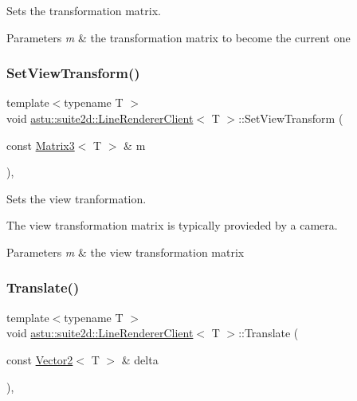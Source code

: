 Sets the transformation matrix.


\begin{DoxyParams}{Parameters}
{\em m} & the transformation matrix to become the current one \\
\hline
\end{DoxyParams}
\mbox{\label{classastu_1_1suite2d_1_1LineRendererClient_a8377c0e0d4427efdedbc4360677bda38}} 
\subsubsection{\texorpdfstring{Set\+View\+Transform()}{SetViewTransform()}}
{\footnotesize\ttfamily template$<$typename T $>$ \\
void \hyperlink{classastu_1_1suite2d_1_1LineRendererClient}{astu\+::suite2d\+::\+Line\+Renderer\+Client}$<$ T $>$\+::Set\+View\+Transform (\begin{DoxyParamCaption}\item[{const \hyperlink{classastu_1_1Matrix3}{Matrix3}$<$ T $>$ \&}]{m }\end{DoxyParamCaption})\hspace{0.3cm}{\ttfamily [inline]}, {\ttfamily [protected]}}

Sets the view tranformation.

The view transformation matrix is typically provieded by a camera.


\begin{DoxyParams}{Parameters}
{\em m} & the view transformation matrix \\
\hline
\end{DoxyParams}
\mbox{\label{classastu_1_1suite2d_1_1LineRendererClient_a0cab0b0c3b4666ba9c7cd6fa238a0ec8}} 
\subsubsection{\texorpdfstring{Translate()}{Translate()}}
{\footnotesize\ttfamily template$<$typename T $>$ \\
void \hyperlink{classastu_1_1suite2d_1_1LineRendererClient}{astu\+::suite2d\+::\+Line\+Renderer\+Client}$<$ T $>$\+::Translate (\begin{DoxyParamCaption}\item[{const \hyperlink{classastu_1_1Vector2}{Vector2}$<$ T $>$ \&}]{delta }\end{DoxyParamCaption})\hspace{0.3cm}{\ttfamily [inline]}, {\ttfamily [protected]}}

